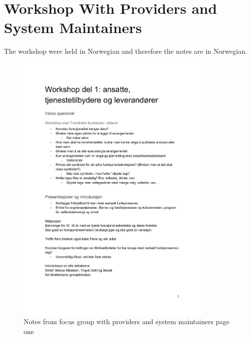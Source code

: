 \section{Workshop With Providers and System Maintainers}
\label{workshop_with_providers_and_system_maintainers}
The workshop were held in Norwegian and therefore the notes are in Norwegian.

\begin{figure}[H]
\centering
    \includegraphics[width=0.85\textwidth]{fig/workshop/providers/WSTilbydere_1.pdf}
    \caption{Notes from focus group with providers and system maintainers page one}
    \label{Provider_1}
\end{figure}

